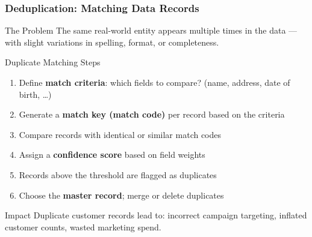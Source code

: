 \begin{frame}
  \frametitle{Deduplication: Matching Data Records}

  \begin{block}{The Problem}
    The same real-world entity appears multiple times in the data ---
    with slight variations in spelling, format, or completeness.
  \end{block}

  \begin{block}{Duplicate Matching Steps}
    \begin{enumerate}
      \item Define \textbf{match criteria}: which fields to compare?
        (name, address, date of birth, \ldots)
      \item Generate a \textbf{match key (match code)} per record based on
        the criteria
      \item Compare records with identical or similar match codes
      \item Assign a \textbf{confidence score} based on field weights
      \item Records above the threshold are flagged as duplicates
      \item Choose the \textbf{master record}; merge or delete duplicates
    \end{enumerate}
  \end{block}

  \begin{alertblock}{Impact}
    Duplicate customer records lead to: incorrect campaign targeting,
    inflated customer counts, wasted marketing spend.
  \end{alertblock}
\end{frame}


